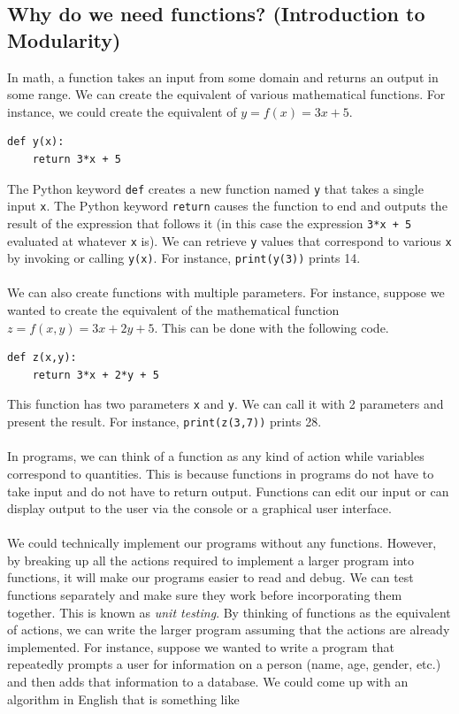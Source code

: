 \documentclass{article}
\begin{document}
\subsection{Why do we need functions? (Introduction to Modularity)}
In math, a function takes an input from some domain and returns an output in some range. We can create the equivalent of various mathematical functions. For instance, we could create the equivalent of $y = f(x) = 3x + 5$.
\begin{verbatim}
def y(x):
    return 3*x + 5
\end{verbatim}
The Python keyword \texttt{def} creates a new function named \texttt{y} that takes a single input \texttt{x}. The Python keyword \texttt{return} causes the function to end and outputs the result of the expression that follows it (in this case the expression \texttt{3*x + 5} evaluated at whatever \texttt{x} is). We can retrieve \texttt{y} values that correspond to various \texttt{x} by invoking or calling \texttt{y(x)}. For instance, \texttt{print(y(3))} prints 14.\\\\
We can also create functions with multiple parameters. For instance, suppose we wanted to create the equivalent of the mathematical function $z = f(x,y) = 3x + 2y + 5$. This can be done with the following code.
\begin{verbatim}
def z(x,y):
    return 3*x + 2*y + 5
\end{verbatim}
This function has two parameters \texttt{x} and \texttt{y}. We can call it with 2 parameters and present the result. For instance, \texttt{print(z(3,7))} prints 28.\\\\
In programs, we can think of a function as any kind of action while variables correspond to quantities. This is because functions in programs do not have to take input and do not have to return output. Functions can edit our input or can display output to the user via the console or a graphical user interface.\\\\
We could technically implement our programs without any functions. However, by breaking up all the actions required to implement a larger program into functions, it will make our programs easier to read and debug. We can test functions separately and make sure they work before incorporating them together. This is known as \textit{unit testing}. By thinking of functions as the equivalent of actions, we can write the larger program assuming that the actions are already implemented. For instance, suppose we wanted to write a program that repeatedly prompts a user for information on a person (name, age, gender, etc.) and then adds that information to a database. We could come up with an algorithm in English that is something like
\end{document}
